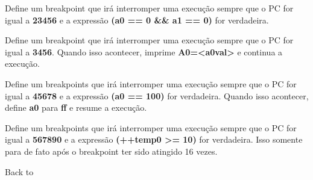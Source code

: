 \documentclass[letterpaper,10pt,brazil]{sphinxmanual}
\begin{document}
\begin{DUlineblock}{0em}
\begin{DUlineblock}{\DUlineblockindent}
\item[] 
\item[] 
\end{DUlineblock}
\item[] Define um breakpoint que irá interromper uma execução sempre que o PC for igual a \textbf{23456} e a expressão \textbf{(a0 == 0 \&\& a1 == 0)} for verdadeira.
\item[] 
\item[]
\begin{DUlineblock}{\DUlineblockindent}
\item[] 
\item[] 
\end{DUlineblock}
\item[] Define um breakpoint que irá interromper uma execução sempre que o PC for igual a \textbf{3456}. Quando isso acontecer, imprime \textbf{A0=\textless{}a0val\textgreater{}} e continua a execução.
\item[] 
\item[]
\begin{DUlineblock}{\DUlineblockindent}
\item[] 
\item[] 
\end{DUlineblock}
\item[] Define um breakpoints que irá interromper uma execução sempre que o PC for igual a \textbf{45678} e a expressão \textbf{(a0 == 100)} for verdadeira. Quando isso acontecer, define \textbf{a0} para \textbf{ff} e resume a execução.
\item[] 
\item[]
\begin{DUlineblock}{\DUlineblockindent}
\item[] 
\item[] 
\end{DUlineblock}
\item[] Define um breakpoints que irá interromper uma execução sempre que o PC for igual a \textbf{567890} e a expressão \textbf{(++temp0 \textgreater{}= 10)} for verdadeira. Isso somente para de fato após o breakpoint ter sido atingido 16 vezes.
\item[] 
\item[] Back to {\hyperref[debugger/breakpoint:debugger\string-breakpoint\string-list]{}}
\end{DUlineblock}
\begin{quote}
\label{debugger/breakpoint:debugger-command-bpclear}\end{quote}
\end{document}
